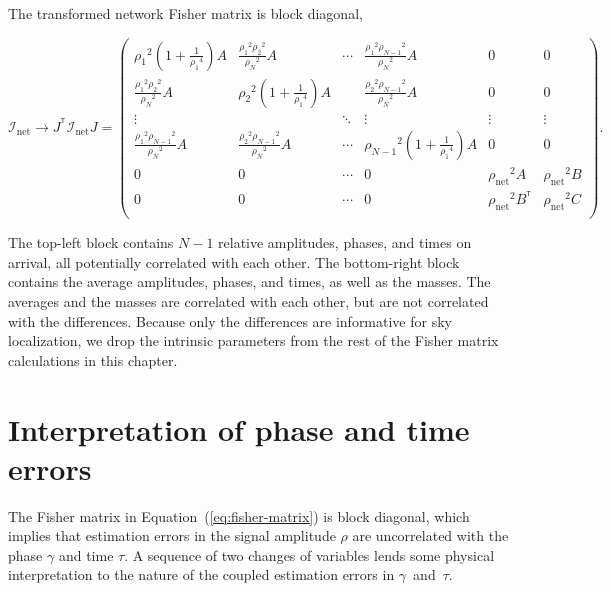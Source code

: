 \documentclass[amsmath,amssymb,aps,prx,reprint,nopreprintnumbers,nofootinbib]{revtex4-1}
\newcommand\transpose{\ensuremath{^{^\mathsf{T}}}}
\begin{document}
%
The transformed network Fisher matrix is block diagonal,
%
\begin{widetext}
\begin{equation}
    \mathcal{I}_\mathrm{net} \rightarrow J\transpose \mathcal{I}_\mathrm{net} J = \left(
    \begin{array}{cccccc}
    {\rho_1}^2(1+\frac{1}{{\rho_1}^4}) A & \frac{{\rho_1}^2 {\rho_2}^2}{{\rho_N}^2} A & \cdots & \frac{{\rho_1}^2 {\rho_{N-1}}^2}{{\rho_N}^2} A & 0 & 0 \\
    \frac{{\rho_1}^2 {\rho_2}^2}{{\rho_N}^2} A & {\rho_2}^2(1+\frac{1}{{\rho_1}^4}) A & & \frac{{\rho_2}^2 {\rho_{N-1}}^2}{{\rho_N}^2} A & 0 & 0 \\
    \vdots & & \ddots & \vdots & \vdots & \vdots \\
    \frac{{\rho_1}^2 {\rho_{N-1}}^2}{{\rho_N}^2} A & \frac{{\rho_2}^2 {\rho_{N-1}}^2}{{\rho_N}^2} A & \cdots & {\rho_{N-1}}^2(1+\frac{1}{{\rho_1}^4}) A & 0 & 0 \\
    0 & 0 & \cdots & 0 & {\rho_\mathrm{net}}^2 A & {\rho_\mathrm{net}}^2 B \\
    0 & 0 & \cdots & 0 & {\rho_\mathrm{net}}^2 B\transpose & {\rho_\mathrm{net}}^2 C \\
    \end{array}
    \right).
\end{equation}
\end{widetext}
%
The top\nobreakdashes-left block contains $N-1$ relative amplitudes, phases, and times on arrival, all potentially correlated with each other. The bottom\nobreakdashes-right block contains the average amplitudes, phases, and times, as well as the masses. The averages and the masses are correlated with each other, but are not correlated with the differences. Because only the differences are informative for sky localization, we drop the intrinsic parameters from the rest of the Fisher matrix calculations in this chapter.

\section{Interpretation of phase and time errors}
\label{sec:interpretation-of-errors}

The Fisher matrix in Equation~(\ref{eq:fisher-matrix}) is block diagonal, which implies that estimation errors in the signal amplitude $\rho$ are uncorrelated with the phase $\gamma$ and time $\tau$. A sequence of two changes of variables lends some physical interpretation to the nature of the coupled estimation errors in $\gamma$~and~$\tau$.
\end{document}
